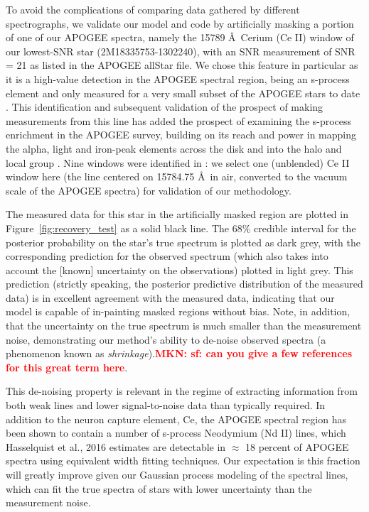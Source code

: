\documentclass[a4paper,fleqn,usenatbib]{mnras}
\newcommand{\mkn}[1]{\textbf{\textcolor{red}{MKN: #1}}}
\begin{document}
To avoid the complications of comparing data gathered by different spectrographs, we validate our model and code by artificially masking a portion of one of our APOGEE spectra, namely the 15789 \AA\ Cerium (Ce II) window of our lowest-SNR star (2M18335753-1302240), with an SNR measurement of SNR = 21 as listed in the APOGEE allStar file. We chose this feature in particular as it is a high-value detection in the APOGEE spectral region, being an s-process element and only measured for a very small subset of the APOGEE stars to date \citep{Cunha2017}. This identification \citep{Cunha2017} and subsequent validation of the prospect of making measurements from this line has added the prospect of examining the s-process enrichment in the APOGEE survey, building on its reach and power in mapping the alpha, light and iron-peak elements across the disk and into the halo and local group \citep[e.g.,][]{Majewski2017, Nidever2014, Hayden2015, Weinberg2019}. Nine windows were identified in \citet{Cunha2017}: we select one (unblended) Ce II window here (the line centered on 15784.75 \AA\ in air, converted to the vacuum scale of the APOGEE spectra) for validation of our methodology. 


The measured data for this star in the artificially masked region are plotted in Figure~\ref{fig:recovery_test} as a solid black line. The 68\% credible interval for the posterior probability on the star's true spectrum is plotted as dark grey, with the corresponding prediction for the observed spectrum (which also takes into account the [known] uncertainty on the observations) plotted in light grey. This prediction (strictly speaking, the posterior predictive distribution of the measured data) is in excellent agreement with the measured data, indicating that our model is capable of in-painting masked regions without bias. Note, in addition, that the uncertainty on the true spectrum is much smaller than the measurement noise, demonstrating our method's ability to de-noise observed spectra (a phenomenon known as {\it shrinkage}).\mkn{ sf: can you give a few references for this great term here}.

This de-noising property is relevant in the regime of extracting information from both weak lines and lower signal-to-noise data than typically required. In addition to the neuron capture element, Ce, the APOGEE spectral region has been shown to contain a number of s-process Neodymium (Nd II) lines, which Hasselquist et al., 2016 estimates are detectable in $\approx$ 18 percent of APOGEE spectra using equivalent width fitting techniques. Our expectation is this fraction will greatly improve given our Gaussian process modeling of the spectral lines, which
can fit the true spectra of stars with lower uncertainty than the measurement noise. 
\end{document}
